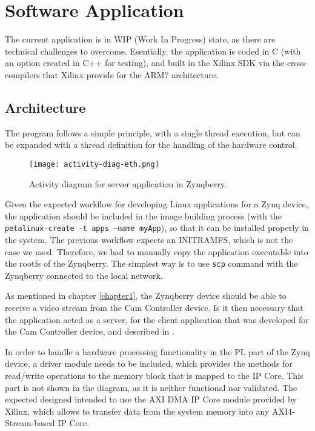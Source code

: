 
\chapter{Software Application} \label{software-application}

The current application is in WIP (Work In Progress) state, as there are technical challenges to
overcome. Esentially, the application is coded in C (with an option created in C++ for testing), and
built in the Xilinx SDK via the cross-compilers that Xilinx provide for the ARM7 architecture.

\section{Architecture}

The program follows a simple principle, with a single thread execution, but can be expanded with a
thread definition for the handling of the hardware control.

\begin{figure}[htp]
	\centering
	\texttt{[image: activity-diag-eth.png]}
	\caption{Activity diagram for server application in Zynqberry.}
	\label{fig:activity-diag-eth}
\end{figure}

Given the expected workflow for developing Linux applications for a Zynq device, the application
should be included in the image building process (with the
\texttt{petalinux-create -t apps --name myApp}), so that it can be installed properly in the system.
The previous workflow expects an INITRAMFS, which is not the case we used. Therefore, we had to
manually copy the application executable into the rootfs of the Zynqberry. The simplest way is to
use \texttt{scp} command with the Zynqberry connected to the local network.

As mentioned in chapter \ref{chapter1}, the Zynqberry device should be able to receive a video
stream from the Cam Controller device. Is it then necessary that the application acted as a server,
for the client application that was developed for the Cam Controller device, and described in
\cite{Poliakov2018}.

In order to handle a hardware processing functionality in the PL part of the Zynq device, a driver
module needs to be included, which provides the methods for read/write operations to the memory
block that is mapped to the IP Core. This part is not shown in the diagram, as it is neither
functional nor validated. The expected designed intended to use the AXI DMA IP Core module provided
by Xilinx, which allows to transfer data from the system memory into any AXI4-Stream-based IP Core.

